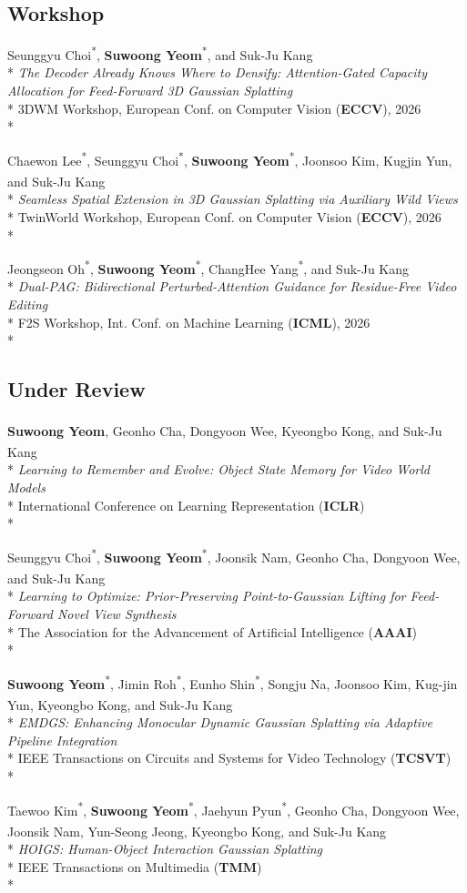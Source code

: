 \documentclass[10pt]{article}
\newcommand{\me}{\textbf{Suwoong Yeom}}
\newcommand{\eq}{\textsuperscript{*}}
\newcommand{\corr}{\textsuperscript{\dag}}
\newcommand{\pub}[5]{%
  \item[{[#1]}] #2\\*
  \textit{#3}\\*
  #4%
  \if\relax\detokenize{#5}\relax\else\\* #5\fi}
\begin{document}
\subsection{Workshop}
\begin{pubs}
  \pub{W3}
      {Seunggyu Choi\eq, \me\eq, and Suk-Ju Kang\corr}
      {The Decoder Already Knows Where to Densify: Attention-Gated Capacity Allocation for Feed-Forward 3D Gaussian Splatting}
      {3DWM Workshop, European Conf. on Computer Vision (\textbf{ECCV}), 2026}
      {}

  \pub{W2}
      {Chaewon Lee\eq, Seunggyu Choi\eq, \me\eq, Joonsoo Kim, Kugjin Yun, and Suk-Ju Kang\corr}
      {Seamless Spatial Extension in 3D Gaussian Splatting via Auxiliary Wild Views}
      {TwinWorld Workshop, European Conf. on Computer Vision (\textbf{ECCV}), 2026}
      {}

  \pub{W1}
      {Jeongseon Oh\eq, \me\eq, ChangHee Yang\eq, and Suk-Ju Kang\corr}
      {Dual-PAG: Bidirectional Perturbed-Attention Guidance for Residue-Free Video Editing}
      {F2S Workshop, Int. Conf. on Machine Learning (\textbf{ICML}), 2026}
      {}
\end{pubs}

\subsection{Under Review}
\begin{pubs}
  \pub{U4}
      {\me, Geonho Cha, Dongyoon Wee,
       Kyeongbo Kong\corr, and Suk-Ju Kang\corr}
      {Learning to Remember and Evolve: Object State Memory for Video World Models}
      {International Conference on Learning Representation (\textbf{ICLR})}
      {}
  \pub{U3}
      {Seunggyu Choi\eq, \me\eq, Joonsik Nam, Geonho Cha, Dongyoon Wee,
       and Suk-Ju Kang\corr}
      {Learning to Optimize: Prior-Preserving Point-to-Gaussian Lifting for Feed-Forward Novel View Synthesis}
      {The Association for the Advancement of Artificial Intelligence (\textbf{AAAI})}
      {}
  \pub{U2}
      {\me\eq, Jimin Roh\eq, Eunho Shin\eq, Songju Na, Joonsoo Kim, Kug-jin Yun,
       Kyeongbo Kong\corr, and Suk-Ju Kang\corr}
      {EMDGS: Enhancing Monocular Dynamic Gaussian Splatting via Adaptive Pipeline Integration}
      {IEEE Transactions on Circuits and Systems for Video Technology (\textbf{TCSVT})}
      {}

  \pub{U1}
      {Taewoo Kim\eq, \me\eq, Jaehyun Pyun\eq, Geonho Cha, Dongyoon Wee, Joonsik Nam,
       Yun-Seong Jeong, Kyeongbo Kong\corr, and Suk-Ju Kang\corr}
      {HOIGS: Human-Object Interaction Gaussian Splatting}
      {IEEE Transactions on Multimedia (\textbf{TMM})}
      {}
\end{pubs}
\end{document}
